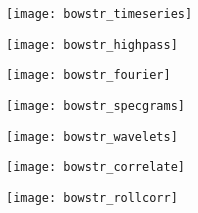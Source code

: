 \documentclass[utf8]{article}
\begin{document}
    \begin{figure}
      \centerline{\texttt{[image: bowstr\_timeseries]}}
      \caption{%
          }
      \label{fig:timeseries}
    \end{figure}

    \begin{figure}
      \centerline{\texttt{[image: bowstr\_highpass]}}
      \caption{%
          }
      \label{fig:highpass}
    \end{figure}

    \begin{figure}
      \centerline{\texttt{[image: bowstr\_fourier]}}
      \caption{%
          }
      \label{fig:fourier}
    \end{figure}

    \begin{figure}
      \centerline{\texttt{[image: bowstr\_specgrams]}}
      \caption{%
          }
      \label{fig:specgrams}
    \end{figure}

    \begin{figure}
      \centerline{\texttt{[image: bowstr\_wavelets]}}
      \caption{%
          }
      \label{fig:wavelets}
    \end{figure}

    \begin{figure}
      \centerline{\texttt{[image: bowstr\_correlate]}}
      \caption{%
          }
      \label{fig:correlate}
    \end{figure}

    \begin{figure}
      \centerline{\texttt{[image: bowstr\_rollcorr]}}
      \caption{%
          }
      \label{fig:rollcorr}
    \end{figure}


\end{document}
